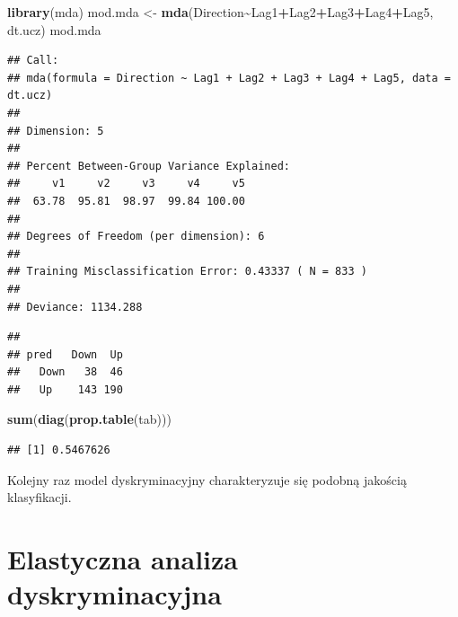 \documentclass[
]{book}
\newenvironment{Shaded}{\begin{snugshade}}{\end{snugshade}}
\newcommand{\AttributeTok}[1]{\textcolor[rgb]{0.13,0.29,0.53}{#1}}
\newcommand{\FunctionTok}[1]{\textcolor[rgb]{0.13,0.29,0.53}{\textbf{#1}}}
\newcommand{\NormalTok}[1]{#1}
\newcommand{\OtherTok}[1]{\textcolor[rgb]{0.56,0.35,0.01}{#1}}
\newcommand{\SpecialCharTok}[1]{\textcolor[rgb]{0.81,0.36,0.00}{\textbf{#1}}}
\theoremstyle{plain}
\theoremstyle{definition}
\theoremstyle{definition}
\theoremstyle{definition}
\theoremstyle{definition}
\theoremstyle{definition}
\theoremstyle{remark}
\begin{document}
\begin{Shaded}
\begin{Highlighting}[]
\FunctionTok{library}\NormalTok{(mda)}
\NormalTok{mod.mda }\OtherTok{\textless{}{-}} \FunctionTok{mda}\NormalTok{(Direction}\SpecialCharTok{\textasciitilde{}}\NormalTok{Lag1}\SpecialCharTok{+}\NormalTok{Lag2}\SpecialCharTok{+}\NormalTok{Lag3}\SpecialCharTok{+}\NormalTok{Lag4}\SpecialCharTok{+}\NormalTok{Lag5, dt.ucz)}
\NormalTok{mod.mda}
\end{Highlighting}
\end{Shaded}

\begin{verbatim}
## Call:
## mda(formula = Direction ~ Lag1 + Lag2 + Lag3 + Lag4 + Lag5, data = dt.ucz)
## 
## Dimension: 5 
## 
## Percent Between-Group Variance Explained:
##     v1     v2     v3     v4     v5 
##  63.78  95.81  98.97  99.84 100.00 
## 
## Degrees of Freedom (per dimension): 6 
## 
## Training Misclassification Error: 0.43337 ( N = 833 )
## 
## Deviance: 1134.288
\end{verbatim}

\begin{Shaded}
\end{Shaded}

\begin{verbatim}
##       
## pred   Down  Up
##   Down   38  46
##   Up    143 190
\end{verbatim}

\begin{Shaded}
\begin{Highlighting}[]
\FunctionTok{sum}\NormalTok{(}\FunctionTok{diag}\NormalTok{(}\FunctionTok{prop.table}\NormalTok{(tab)))}
\end{Highlighting}
\end{Shaded}

\begin{verbatim}
## [1] 0.5467626
\end{verbatim}

Kolejny raz model dyskryminacyjny charakteryzuje się podobną jakością klasyfikacji.

\section{Elastyczna analiza dyskryminacyjna}\label{elastyczna-analiza-dyskryminacyjna}
\end{document}
